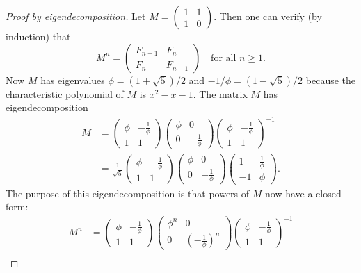 \documentclass[12pt]{article}
\begin{document}
\newpage
\begin{proof}[Proof by eigendecomposition]
    Let $M=\begin{pmatrix}1&1\\1&0\end{pmatrix}$. Then one can verify (by induction) that
    \[M^n=\begin{pmatrix}F_{n+1}&F_n\\F_n&F_{n-1}\end{pmatrix}\quad\text{for all }n\geq 1.\]
    Now $M$ has eigenvalues $\phi=(1+\sqrt5)/2$ and $-1/\phi=(1-\sqrt5)/2$ because the characteristic polynomial of $M$ is $x^2-x-1$. The matrix $M$ has eigendecomposition
    \[\begin{split}
        M&=\begin{pmatrix}\phi&-\frac 1{\phi}\\1&1\end{pmatrix}\begin{pmatrix}\phi&0\\0&-\frac 1{\phi}\end{pmatrix}\begin{pmatrix}\phi&-\frac 1{\phi}\\1&1\end{pmatrix}^{-1}\\
        &= \frac 1{\sqrt5}\begin{pmatrix}\phi&-\frac 1{\phi}\\1&1\end{pmatrix}\begin{pmatrix}\phi&0\\0&-\frac 1{\phi}\end{pmatrix}\begin{pmatrix}1&\frac 1{\phi}\\-1&\phi\end{pmatrix}.
        \end{split}\]
    The purpose of this eigendecomposition is that powers of $M$ now have a closed form:
    \[\begin{split}
        M^n&=\begin{pmatrix}\phi&-\frac 1{\phi}\\1&1\end{pmatrix}\begin{pmatrix}\phi^n&0\\0&\left(-\frac 1{\phi}\right)^n\end{pmatrix}\begin{pmatrix}\phi&-\frac 1{\phi}\\1&1\end{pmatrix}^{-1}\\

\end{split}\]
\end{proof}
\end{document}
